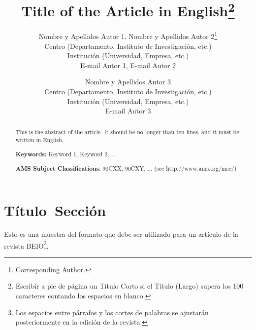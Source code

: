 \documentclass[10pt,twoside,spanish]{article}
\numberwithin{equation}{section}
\begin{document}
\title{%
\vspace*{-2cm}%
Title of the Article in English\thanks{%
Escribir a pie de página un Título Corto si el Título (Largo) supera los 100
caracteres contando los espacios en blanco.}%
\vspace*{-0.2cm}%
}
\author{Nombre y Apellidos Autor 1, Nombre y Apellidos Autor 2\thanks{%
Corresponding Author.} \\
Centro (Departamento, Instituto de Investigación, etc.) \\
Institución (Universidad, Empresa, etc.)\\
E-mail Autor 1, E-mail Autor 2 \and Nombre y Apellidos Autor 3 \\
Centro (Departamento, Instituto de Investigación, etc.) \\
Institución (Universidad, Empresa, etc.)\\
E-mail Autor 3}
\date{%
\vspace*{-1cm}%
}
\maketitle

\begin{abstract}
This is the abstract of the article. It should be no longer than ten lines,
and it must be written in English.\medskip

\noindent \textbf{Keywords:} Keyword 1, Keyword 2, ...

\noindent \textbf{AMS Subject Classifications}: 90CXX, 90CXY, ... (see
http://www.ams.org/msc/)
\end{abstract}

%

\section{Título\textbf{\ Sección}}

Esto es una muestra del formato que debe ser utilizado para un artículo de
la revista BEIO\footnote{%
Los espacios entre párrafos y los cortes de palabras se ajustarán
posteriormente en la edición de la revista.}.
\end{document}
